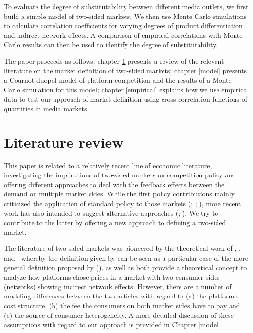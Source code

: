 \documentclass[12pt,a4paper,notitlepage]{article}
\begin{document}
To evaluate the degree of substitutability between different media outlets, we first build a simple model of two-sided markets. We then use Monte Carlo simulations to calculate correlation coefficients for varying degrees of product differentiation and indirect network effects. A comparison of empirical correlations with Monte Carlo results can then be used to identify the degree of substitutability. 

The paper proceeds as follows: chapter \ref{litrev} presents a review of the relevant literature on the market definition of two-sided markets; chapter \ref{model} presents a Cournot duopol model of platform competition and the results of a Monte Carlo simulation for this model; chapter \ref{empirical}  explains how we use empirical data to test our approach of market definition using cross-correlation functions of quantities in media markets.



\section{Literature review}\label{litrev}
This paper is related to a relatively recent line of economic literature, investigating the implications of two-sided markets on competition policy and offering different approaches to deal with the feedback effects between the demand on multiple market sides. While the first policy contributions mainly criticized the application of standard policy to those markets (\citet{wright_onesided_2004}; \citet{leonello_horizontal_2010}; \cite{chandra_mergers_2009}), more recent work has also intended to suggest alternative approaches (\citet{argentesi_estimating_2007}; \citet{song_estimating_2015}). We try to contribute to the latter by offering a new approach to defining a two-sided market. 

The literature of two-sided markets was pioneered by the theoretical work of \citet{caillaud_chicken_2003}, \citet{rochet_platform_2003}, \citet{evans_antitrust_2003} and \citet{armstrong_competition_2006}, whereby the definition given by \citet{evans_antitrust_2003} can be seen as a particular case of the more general definition proposed by \cite{rochet_platform_2003} (\citet{filistrucchi_identifying_2012}). \citet{rochet_platform_2003} as well as \citet{armstrong_competition_2006} both provide a theoretical concept to analyze how platforms chose prices in a market with two consumer sides (networks) showing indirect network effects. However, there are a number of modeling differences between the two articles with regard to (a) the platform's cost structure, (b) the fee the consumers on both market sides have to pay and (c) the source of consumer heterogeneity. A more detailed discussion of these assumptions with regard to our approach is provided in Chapter \ref{model}.  
\end{document}
